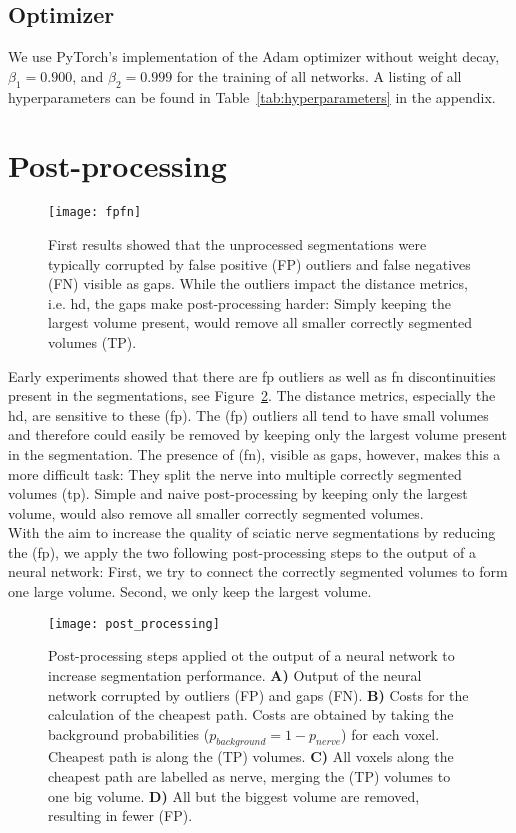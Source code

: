 \subsection{Optimizer}
We use PyTorch's implementation of the Adam optimizer \cite{Kingma2014Adam:Optimization} without weight decay, $\beta_1 = 0.900$, and $\beta_2 = 0.999$ for the training of all networks. A listing of all hyperparameters can be found in Table~\ref{tab:hyperparameters} in the appendix.

\section{Post-processing} \label{sec:postprocessing}
\begin{figure}[htbp]
    \centering
	\texttt{[image: fpfn]}
    \caption[Segmentation Issues]{First results showed that the unprocessed segmentations were typically corrupted by false positive (FP) outliers and false negatives (FN) visible as gaps. While the outliers impact the distance metrics, i.e. \gls{hd}, the gaps make post-processing harder: Simply keeping the largest volume present, would remove all smaller correctly segmented volumes (TP).}
    \label{fig:fpfn}
\end{figure}
Early experiments showed that there are \gls{fp} outliers as well as \gls{fn} discontinuities present in the segmentations, see Figure~\ref{fig:post_processing}. The distance metrics, especially the \acrshort{hd}, are sensitive to these (\acrshort{fp}). The (\acrshort{fp}) outliers all tend to have small volumes and therefore could easily be removed by keeping only the largest volume present in the segmentation. The presence of (\acrshort{fn}), visible as gaps, however, makes this a more difficult task: They split the nerve into multiple correctly segmented volumes (\acrshort{tp}). Simple and naive post-processing by keeping only the largest volume, would also remove all smaller correctly segmented volumes.\\
With the aim to increase the quality of sciatic nerve segmentations by reducing the (\acrshort{fp}), we apply the two following post-processing steps to the output of a neural network: First, we try to connect the correctly segmented volumes to form one large volume. Second, we only keep the largest volume.\\
\begin{figure}[htbp]	
	\texttt{[image: post\_processing]}
    \caption[Post-processing]{Post-processing steps applied ot the output of a neural network to increase segmentation performance. \textbf{A)} Output of the neural network corrupted by outliers (FP) and gaps (FN). \textbf{B)} Costs for the calculation of the cheapest path. Costs are obtained by taking the background probabilities ($p_{background} = 1 - p_{nerve}$) for each voxel. Cheapest path is along the (TP) volumes. \textbf{C)} All voxels along the cheapest path are labelled as nerve, merging the (TP) volumes to one big volume. \textbf{D)} All but the biggest volume are removed, resulting in fewer (FP).}
    \label{fig:post_processing}
\end{figure}
